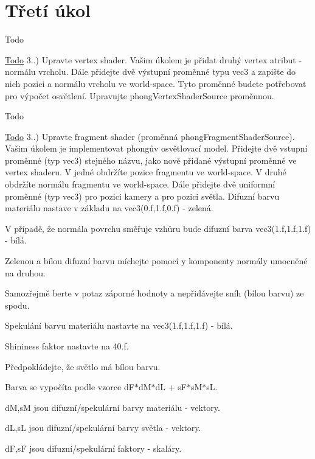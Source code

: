 \hypertarget{group__task3}{\section{Třetí úkol}
\label{group__task3}
}
\begin{DoxyRefDesc}{Todo}
\item[\hyperlink{todo__todo000002}{Todo}]3..) Upravte vertex shader. Vašim úkolem je přidat druhý vertex atribut -\/ normálu vrcholu. Dále přidejte dvě výstupní proměnné typu vec3 a zapište do nich pozici a normálu vrcholu ve world-\/space. Tyto proměnné budete potřebovat pro výpočet osvětlení. Upravujte phong\-Vertex\-Shader\-Source proměnnou. \end{DoxyRefDesc}


\begin{DoxyRefDesc}{Todo}
\item[\hyperlink{todo__todo000003}{Todo}]3..) Upravte fragment shader (proměnná phong\-Fragment\-Shader\-Source). Vašim úkolem je implementovat phongův osvětlovací model. Přidejte dvě vstupní proměnné (typ vec3) stejného názvu, jako nově přidané výstupní proměnné ve vertex shaderu. V jedné obdržíte pozice fragmentu ve world-\/space. V druhé obdržíte normálu fragmentu ve world-\/space. Dále přidejte dvě uniformní proměnné (typ vec3) pro pozici kamery a pro pozici světla. Difuzní barvu materiálu nastave v základu na vec3(0.\-f,1.\-f,0.\-f) -\/ zelená.\par
 V případě, že normála povrchu směřuje vzhůru bude difuzní barva vec3(1.\-f,1.\-f,1.\-f) -\/ bílá.\par
 Zelenou a bílou difuzní barvu míchejte pomocí y komponenty normály umocněné na druhou.\par
 Samozřejmě berte v potaz záporné hodnoty a nepřidávejte sníh (bílou barvu) ze spodu.\par
 Spekulání barvu materiálu nastavte na vec3(1.\-f,1.\-f,1.\-f) -\/ bílá.\par
 Shininess faktor nastavte na 40.\-f.\par
 Předpokládejte, že světlo má bílou barvu.\par
 Barva se vypočíta podle vzorce d\-F$\ast$d\-M$\ast$d\-L + s\-F$\ast$s\-M$\ast$s\-L.\par
 d\-M,s\-M jsou difuzní/spekulární barvy materiálu -\/ vektory.\par
 d\-L,s\-L jsou difuzní/spekulární barvy světla -\/ vektory.\par
 d\-F,s\-F jsou difuzní/spekulární faktory -\/ skaláry.\par

\end{DoxyRefDesc}
